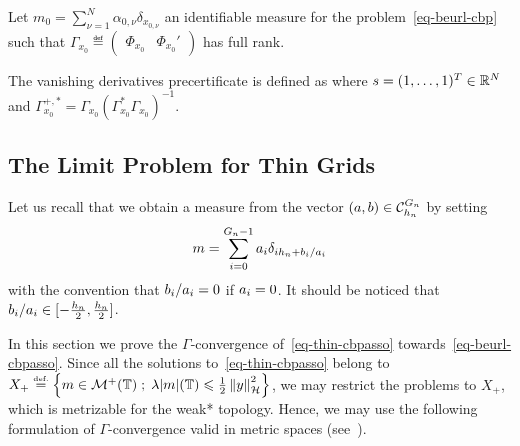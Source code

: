 \begin{defn}
  Let $m_0=\sum_{\nu=1}^N\alpha_{0,\nu} \delta_{x_{0,\nu}}$ an identifiable measure for the problem~\eqref{eq-beurl-cbp} such that $\Gamma_{x_0}\eqdef \begin{pmatrix}
    \Phi_{x_0} & \Phi_{x_0}'
  \end{pmatrix}$ has full rank.
  
The vanishing derivatives precertificate is defined as
     where $s=(1, \ldots,1)^T\in \mathbb{R}^N$  and $\Gamma_{x_0}^{+,*}=\Gamma_{x_0}(\Gamma_{x_0}^*\Gamma_{x_0})^{-1}$.
   \label{prop-etav-nonvanish}
\end{defn}


\subsection{The Limit Problem for Thin Grids}

Let us recall that we obtain a measure from the vector $(a,b)\in \mathcal{C}_{h_n}^{G_n}$ by setting
\begin{align}
  m=\sum_{i=0}^{{G_n}-1} a_{i} \delta_{i{h_n}+b_i/a_i } \label{eq-cbp-measure}
\end{align}
with the convention that $b_i/a_i=0$ if $a_i=0$. It should be noticed that $b_i/a_i\in [-\frac{{h_n}}{2},\frac{{h_n}}{2}]$.

In this section we prove the $\Gamma$-convergence of~\eqref{eq-thin-cbpasso} towards~\eqref{eq-beurl-cbpasso}. Since all the solutions to~\eqref{eq-thin-cbpasso} belong to $X_+ \stackrel{\mbox{\upshape\tiny def.}}{=} \left\{ m\in \mathcal{M}^+(\mathbb{T}) \;;\; \lambda |m|(\mathbb{T})\leqslant \frac{1}{2}\left\lVert y \right\rVert_{\mathcal{H}}^2 \right\}$, we may restrict the problems to $X_+$,  which is metrizable for the weak* topology. Hence, we may use the following formulation of $\Gamma$-convergence valid in metric spaces (see~\cite{Dalmaso1993}).
  
